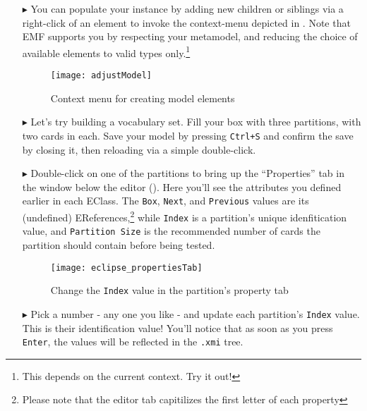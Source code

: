 \begin{itemize}
\clearpage

\item[$\blacktriangleright$] You can populate your instance by adding new children or siblings via a right-click of an element to invoke the
context-menu depicted in . Note that EMF supports you by respecting your metamodel, and reducing the choice of available
elements to valid types only.\footnote{This depends on the current context. Try it out!}

\begin{figure}[htbp]
	\centering
  \texttt{[image: adjustModel]}
	\caption{Context menu for creating model elements}
	\label{eclipse:create_instance}
\end{figure}

\item[$\blacktriangleright$] Let's try building a vocabulary set. Fill your box with three partitions, with two cards in each. Save your model by pressing
\texttt{Ctrl+S} and confirm the save by closing it, then reloading via a simple double-click.

\item[$\blacktriangleright$] Double-click on one of the partitions to bring up the ``Properties'' tab in the window below the editor
(). Here you'll see the attributes you defined earlier in each EClass. The \texttt{Box}, \texttt{Next}, and
\texttt{Previous} values are its (undefined) EReferences,\footnote{Please note that the editor tab capitilizes the first letter of each property} while \texttt{Index} is a
partition's unique idenfitication value, and \texttt{Partition Size} is the recommended number of cards the partition should contain before being tested.

\begin{figure}[h]
	\centering
  \texttt{[image: eclipse\_propertiesTab]}
	\caption{Change the \texttt{Index} value in the partition's property tab}
	\label{eclipse:properties_partition}
\end{figure}
\FloatBarrier

\vspace{0.5cm}

\item[$\blacktriangleright$] Pick a number - any one you like - and update each partition's \texttt{Index} value. This is their identification value! You'll
notice that as soon as you press \texttt{Enter}, the values will be reflected in the \texttt{.xmi} tree.


\end{itemize}
